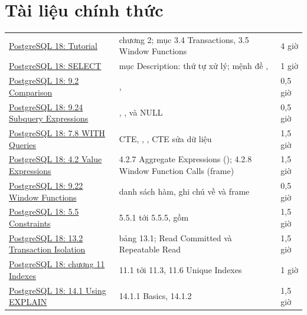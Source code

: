 \section{Tài liệu chính thức}

\begin{xltabular}{\textwidth}{@{}P{4.2cm} L P{1.8cm}@{}}
\toprule
{} &  &  \\
\midrule
\endhead
\bottomrule
\endfoot
\href{https://www.postgresql.org/docs/current/tutorial.html}{PostgreSQL 18: Tutorial} & chương 2; mục 3.4 Transactions, 3.5 Window Functions & 4 giờ \\
\href{https://www.postgresql.org/docs/current/sql-select.html}{PostgreSQL 18: SELECT} & mục Description: thứ tự xử lý; mệnh đề ,  & 1 giờ \\
\href{https://www.postgresql.org/docs/current/functions-comparison.html}{PostgreSQL 18: 9.2 Comparison} & ,  & 0,5 giờ \\
\href{https://www.postgresql.org/docs/current/functions-subquery.html}{PostgreSQL 18: 9.24 Subquery Expressions} & , ,  và NULL & 0,5 giờ \\
\href{https://www.postgresql.org/docs/current/queries-with.html}{PostgreSQL 18: 7.8 WITH Queries} & CTE, , , CTE sửa dữ liệu & 1,5 giờ \\
\href{https://www.postgresql.org/docs/current/sql-expressions.html}{PostgreSQL 18: 4.2 Value Expressions} & 4.2.7 Aggregate Expressions (); 4.2.8 Window Function Calls (frame) & 1,5 giờ \\
\href{https://www.postgresql.org/docs/current/functions-window.html}{PostgreSQL 18: 9.22 Window Functions} & danh sách hàm, ghi chú về  và frame & 0,5 giờ \\
\href{https://www.postgresql.org/docs/current/ddl-constraints.html}{PostgreSQL 18: 5.5 Constraints} & 5.5.1 tới 5.5.5, gồm  & 1,5 giờ \\
\href{https://www.postgresql.org/docs/current/transaction-iso.html}{PostgreSQL 18: 13.2 Transaction Isolation} & bảng 13.1; Read Committed và Repeatable Read & 1,5 giờ \\
\href{https://www.postgresql.org/docs/current/indexes.html}{PostgreSQL 18: chương 11 Indexes} & 11.1 tới 11.3, 11.6 Unique Indexes & 1 giờ \\
\href{https://www.postgresql.org/docs/current/using-explain.html}{PostgreSQL 18: 14.1 Using EXPLAIN} & 14.1.1 Basics, 14.1.2  & 1,5 giờ \\

\end{xltabular}
